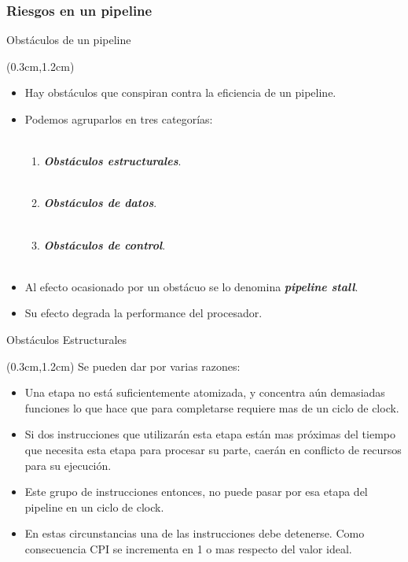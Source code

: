 \documentclass[table,dvipsnames,aspectratio=169]{beamer}
\begin{document}
\subsubsection{Riesgos en un pipeline}
\begin{frame}{Obstáculos de un pipeline}
 \begin{textblock*}{\textwidth}(0.3cm,1.2cm)
  \begin{itemize}[<+(1)->] \justifying \parskip 0.2cm
   \item Hay \textcolor{furfiBlue}{obstáculos} que conspiran contra la eficiencia de un pipeline.\\
   \item Podemos agruparlos en tres categorías:\\\
   \begin{enumerate}
    \item \textbf{\textit{\color{blue}Obstáculos estructurales}}.\\\
    \item \textbf{\textit{\color{blue}Obstáculos de datos}}.\\\
    \item \textbf{\textit{\color{blue}Obstáculos de control}}.\\\
   \end{enumerate}
   \item Al \textcolor{furfiBlue}{efecto ocasionado} por un obstácuo se lo denomina \textbf{\textit{\color{blue}pipeline stall}}.\\
   \item Su efecto degrada la performance del procesador.
  \end{itemize}
 \end{textblock*}
\end{frame}
 
\begin{frame}{Obstáculos Estructurales}
 \begin{textblock*}{\textwidth}(0.3cm,1.2cm)
  Se pueden dar por varias razones:
  \begin{itemize}[<+->] \justifying \parskip 0.3cm
   \item \textcolor{furfiBlue}{Una etapa no está suficientemente atomizada}, y concentra aún demasiadas funciones lo que hace que para completarse requiere mas de un ciclo de clock.
   \item Si dos instrucciones que utilizarán esta etapa están mas próximas del tiempo que necesita esta etapa para procesar su parte, \textcolor{furfiBlue}{caerán en conflicto de recursos para su ejecución}.
   \item Este grupo de instrucciones entonces, no puede pasar por esa etapa del pipeline en un ciclo de clock.
   \item En estas circunstancias \textcolor{furfiBlue}{una de las instrucciones debe detenerse}. Como consecuencia CPI se incrementa en 1 o mas respecto del valor ideal.
  \end{itemize}
 \end{textblock*}
 \end{frame}
\end{document}
